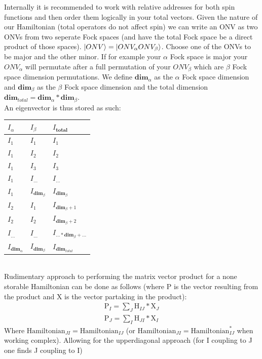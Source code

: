 Internally it is recommended to work with relative addresses for both spin functions and then order them logically in your total vectors. Given the nature of our Hamiltonian (total operators do not affect spin) we can write an ONV as two ONVs from two seperate Fock spaces (and have the total Fock space be a direct product of those spaces). $\ket{ONV} = \ket{ONV_\alpha ONV_\beta}$. Choose one of the ONVs to be major and the other minor. If for example your $\alpha$ Fock space is major your $ONV_\alpha$ will permutate after a full permutation of your $ONV_\beta$ which are $\beta$ Fock space dimension permutations.
We define $\textbf{dim}_\alpha$ as the $\alpha$ Fock space dimension and $\textbf{dim}_\beta$ as the $\beta$ Fock space dimension and the total dimension $\textbf{dim}_{total} = \textbf{dim}_\alpha * \textbf{dim}_\beta$. \\
An eigenvector is thus stored as such:
\begin{tabular}{|l|l||l|}
\hline
$I_{\alpha}$ & $I_{\beta}$ & $I_{\textbf{total}}$ \\ \hline
$I_1$ & $I_1$ & $I_1$ \\ \hline
$I_1$ & $I_2$ & $I_2$ \\ \hline
$I_1$ & $I_3$ & $I_3$ \\ \hline
$I_1$ & $I_{...}$ & $I_{...}$ \\ \hline
$I_1$ & $I_{\textbf{dim}_\beta}$ & $I_{\textbf{dim}_\beta}$ \\ \hline
$I_2$ & $I_{1}$ & $I_{\textbf{dim}_\beta + 1}$ \\ \hline
$I_2$ & $I_{2}$ & $I_{\textbf{dim}_\beta + 2}$ \\ \hline
$I_{...}$ & $I_{...}$ & $I_{... * \textbf{dim}_\beta + ...}$ \\ \hline
$I_{\textbf{dim}_\alpha}$ & $I_{\textbf{dim}_\beta}$ & $I_{\textbf{dim}_{total}}$ \\ \hline
\end{tabular}
\\
Rudimentary approach to performing the matrix vector product for a none storable Hamiltonian can be done as follows (where P is the vector resulting from the product and X is the vector partaking in the product):
\begin{align}
  \text{P}_{I} = \sum_J \text{H}_{IJ} * \text{X}_{J} \\
  \text{P}_{J} = \sum_I \text{H}_{JI} * \text{X}_{I}
\end{align}
Where $\text{Hamiltonian}_{JI} = \text{Hamiltonian}_{IJ}$ (or $\text{Hamiltonian}_{JI} = \text{Hamiltonian}_{IJ}^*$ when working complex). Allowing for the upperdiagonal approach (for I coupling to J one finds J coupling to I)

